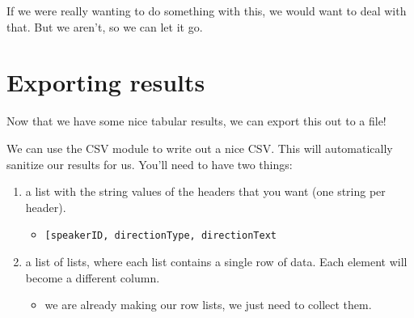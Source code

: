 \documentclass[11pt]{article}
\providecommand{\tightlist}{%
      \setlength{\itemsep}{0pt}\setlength{\parskip}{0pt}}
\begin{document}
    If we were really wanting to do something with this, we would want to
deal with that. But we aren't, so we can let it go.

    \section{Exporting results}\label{exporting-results}

Now that we have some nice tabular results, we can export this out to a
file!

We can use the CSV module to write out a nice CSV. This will
automatically sanitize our results for us. You'll need to have two
things:

\begin{enumerate}
\def\labelenumi{\arabic{enumi}.}
\tightlist
\item
  a list with the string values of the headers that you want (one string
  per header).

  \begin{itemize}
  \tightlist
  \item
    \texttt{{[}\textquotesingle{}speakerID\textquotesingle{},\ \textquotesingle{}directionType\textquotesingle{},\ \textquotesingle{}directionText\textquotesingle{}{]}}
  \end{itemize}
\item
  a list of lists, where each list contains a single row of data. Each
  element will become a different column.

  \begin{itemize}
  \tightlist
  \item
    we are already making our row lists, we just need to collect them.
  \end{itemize}
\end{enumerate}
\end{document}
